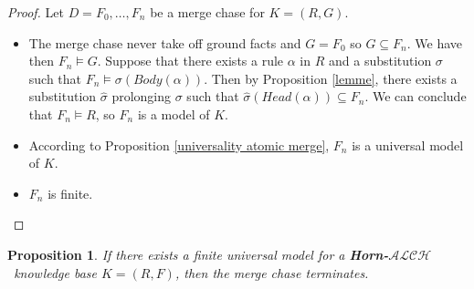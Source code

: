\documentclass{article}
\newtheorem{proposition}{Proposition}[section]
\theoremstyle{definition}
\theoremstyle{remark}
\newcommand{\ALCH}{\textbf{Horn-$\mathcal{ALCH}$}}
\begin{document}
\begin{proof}
Let $D = F_0,\ldots,F_n$ be a merge chase for $K =(R,G)$. 
\begin{itemize}
\item The merge chase never take off ground facts and $G =F_0$ so $G \subseteq F_n$. We have then $F_n \vDash G$. Suppose that there exists a rule $\alpha$ in $R$ and a substitution $\sigma$ such that $F_n \vDash \sigma(\textit{Body}(\alpha))$. Then by Proposition \ref{lemme}, there exists a substitution $\hat \sigma$ prolonging $\sigma$ such that $\hat \sigma(\textit{Head}(\alpha)) \subseteq F_n$. We can conclude that $F_n \vDash R$, so $F_n$ is a model of $K$.
\item According to Proposition \ref{universality atomic merge}, $F_n$ is a universal model of $K$.
\item $F_n$ is finite.
\end{itemize}
\end{proof}

\begin{proposition} \label{finite -> terminates}
If there exists a finite universal model for a \ALCH\ knowledge base $K = (R,F)$, then the merge chase terminates.
\end{proposition}
\end{document}

